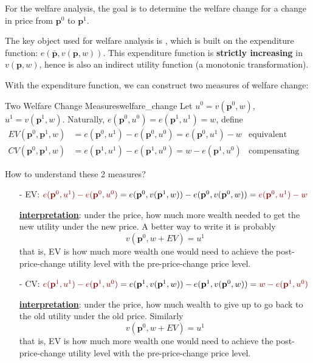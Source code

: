 For the welfare analysis, the goal is to determine the welfare change for a change in price from $\mathbf{p}^0$ to $\mathbf{p}^1$.

The key object used for welfare analysis is , which is built on the expenditure function: $e(\bar{\mathbf{p}},v(\mathbf{p},w))$. This expenditure function is \textbf{strictly increasing} in $v(\mathbf{p},w)$, hence is also an indirect utility function (a monotonic transformation).

With the expenditure function, we can construct two measures of welfare change:
\begin{definition}{Two Welfare Change Measures}{welfare_change}
    Let $u^0 = v(\mathbf{p}^0,w)$, $u^1 = v(\mathbf{p}^1,w)$. Naturally, $e(\mathbf{p}^0,u^0)=e(\mathbf{p}^1,u^1)=w$, define
    \begin{align*}
        EV(\mathbf{p}^0,\mathbf{p}^1,w) &=e(\mathbf{p}^0,u^1)-e(\mathbf{p}^0,u^0)=e(\mathbf{p}^0,u^1)-w & \text{equivalent variation}\\
        CV(\mathbf{p}^0,\mathbf{p}^1,w) &=e(\mathbf{p}^1,u^1)-e(\mathbf{p}^1,u^0)=w-e(\mathbf{p}^1,u^0) & \text{compensating variation}
    \end{align*}
\end{definition}

How to understand these 2 measures?

\begin{itemize}
    \item[-] EV: ${\color{red!55!black}e(\mathbf{p}^0,u^1)-e(\mathbf{p}^0,u^0)} = e(\mathbf{p}^0,v(\mathbf{p}^1,w))-e(\mathbf{p}^0,v(\mathbf{p}^0,w)) = {\color{red!55!black}e(\mathbf{p}^0,u^1)-w}$
    
    \underline{\textbf{interpretation}}: under the  price, how much more wealth needed to get the new utility under the new price. A better way to write it is probably
    $$
    v \left(\mathbf{p}^0, w+EV \right)=u^1
    $$
    that is, EV is how much more wealth one would need to achieve the post-price-change utility level with the pre-price-change price level.
    
    \item[-] CV: ${\color{red!55!black}e(\mathbf{p}^1,u^1)-e(\mathbf{p}^1,u^0)} = e(\mathbf{p}^1,v(\mathbf{p}^1,w))-e(\mathbf{p}^1,v(\mathbf{p}^0,w)) = {\color{red!55!black}w- e(\mathbf{p}^1,u^0)}$
    
    \underline{\textbf{interpretation}}: under the  price, how much wealth to give up to go back to the old utility under the old price. Similarly
    $$
    v \left(\mathbf{p}^0, w+EV \right)=u^1
    $$
    that is, EV is how much more wealth one would need to achieve the post-price-change utility level with the pre-price-change price level.
\end{itemize}